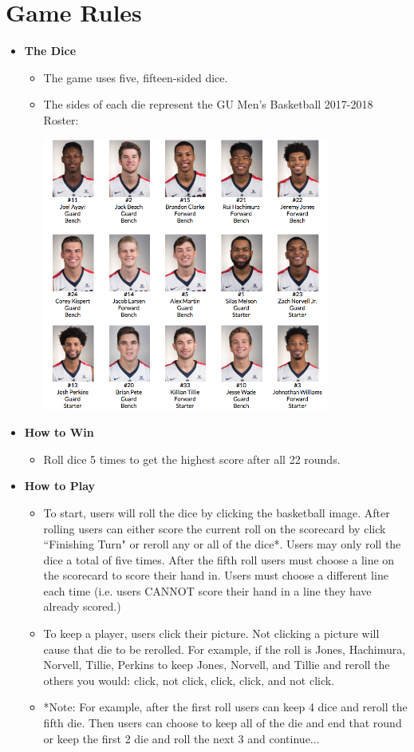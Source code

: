 \documentclass[]{report}   %
\begin{document}
\section{Game Rules}       %
\begin{itemize}

\item \textbf{The Dice}
\begin{itemize}
\item The game uses five, fifteen-sided dice.
\item The sides of each die represent the GU Men's Basketball 2017-2018 Roster: 
\begin{center}
\includegraphics[width=3.7in]{Graphics/RosterScreenshot}
\end{center}
\end{itemize}

\item \textbf{How to Win}
\begin{itemize}
\item Roll dice 5 times to get the highest score after all 22 rounds.
\end{itemize}

\item \textbf{How to Play}
\begin{itemize}
\item To start, users will roll the dice by clicking the basketball image. After rolling users can either score the current roll on the scorecard by click ``Finishing Turn" or reroll any or all of the dice*. Users may only roll the dice a total of five times. After the fifth roll users must choose a line on the scorecard to score their hand in. Users must choose a different line each time (i.e. users CANNOT score their hand in a line they have already scored.)
\item To keep a player, users click their picture. Not clicking a picture will cause that die to be rerolled. For example, if the roll is Jones, Hachimura, Norvell, Tillie, Perkins to keep Jones, Norvell, and Tillie and reroll the others you would: click, not click, click, click, and not click.
\item *Note: For example, after the first roll users can keep 4 dice and reroll the fifth die. Then users can choose to keep all of the die and end that round or keep the first 2 die and roll the next 3 and continue...


\end{itemize}
\end{itemize}
\end{document}
